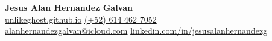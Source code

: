 \begin{center}
    {\huge\textbf{\color{darktext}Jesus Alan Hernandez Galvan}} \\[1em]
    
    {\footnotesize\color{lightgray}\faGlobe} \hspace{0.3em} \href{https://unlikeghost.github.io}{\color{linkblue}unlikeghost.github.io} \quad \quad
    {\footnotesize\color{lightgray}\faPhone} \hspace{0.3em} \href{callto:+526144627052}{\color{linkblue}(+52) 614 462 7052} \\[0.6em]

    {\footnotesize\color{lightgray}\faEnvelope} \hspace{0.3em} \href{mailto:alanhernandezgalvan@icloud.com}{\color{linkblue}alanhernandezgalvan@icloud.com} \quad \quad
    {\footnotesize\color{lightgray}\faLinkedin} \hspace{0.3em} \href{https://linkedin.com/in/jesusalanhernandezg}{\color{linkblue}linkedin.com/in/jesusalanhernandezg} \\[0.6em]
    
\end{center}
